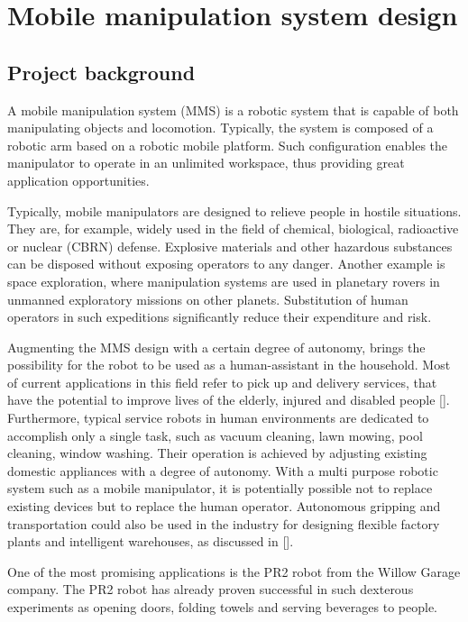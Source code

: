\chapter{Mobile manipulation system design}
\label{cha:mmsdesign}


\section{Project background}
\label{sec:background}

A mobile manipulation system (MMS) is a robotic system that is capable of both manipulating objects and locomotion. Typically, the system is composed of a robotic arm based on a robotic mobile platform. Such configuration enables the manipulator to operate in an unlimited workspace, thus providing great application opportunities.

Typically, mobile manipulators are designed to relieve people in hostile situations. They are, for example, widely used in the field of chemical, biological, radioactive or nuclear (CBRN) defense. Explosive materials and other hazardous substances can be disposed without exposing operators to any danger. Another example is space exploration, where manipulation systems are used in planetary rovers in unmanned exploratory missions on other planets. Substitution of human operators in such expeditions significantly reduce their expenditure and risk.

Augmenting the MMS design with a certain degree of autonomy, brings the possibility for the robot to be used as a human-assistant in the household. Most of current applications in this field refer to pick up and delivery services, that have the potential to improve lives of the elderly, injured and disabled people []. Furthermore, typical service robots in human environments are dedicated to accomplish only a single task, such as vacuum cleaning, lawn mowing, pool cleaning, window washing. Their operation is achieved by adjusting existing domestic appliances with a degree of autonomy. With a multi purpose robotic system such as a mobile manipulator, it is potentially possible not to replace existing devices but to replace the human operator. Autonomous gripping and transportation could also be used in the industry for designing flexible factory plants and intelligent warehouses, as discussed in []. 

One of the most promising applications is the PR2 robot from the Willow Garage company. The PR2 robot has already proven successful in such dexterous experiments as opening doors, folding towels and serving beverages to people. 

